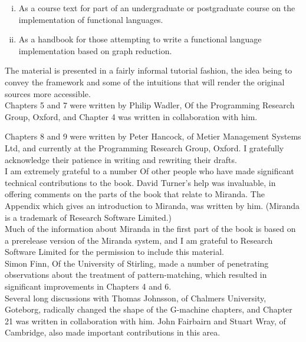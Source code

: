 \documentclass[11pt,a4paper]{book}
\begin{document}
\begin{enumerate}[(i)]
\itemsep-3pt
\item As a course text for part of an undergraduate or postgraduate course on 
the implementation of functional languages. 
\item As a handbook for those attempting to write a functional language 
implementation based on graph reduction.
\end{enumerate}

The material is presented in a fairly informal tutorial fashion, the idea being to 
convey the framework and some of the intuitions that will render the original 
sources more accessible.\\
 
Chapters 5 and 7 were written by Philip Wadler, Of the Programming 
Research Group, Oxford, and Chapter 4 was written in collaboration with
him.

\newpage

\noindent Chapters 8 and 9 were written by Peter Hancock, of Metier Management 
Systems Ltd, and currently at the Programming Research Group, Oxford. I 
gratefully acknowledge their patience in writing and rewriting their drafts.\\

I am extremely grateful to a number Of other people who have made 
significant technical contributions to the book. David Turner's help was 
invaluable, in offering comments on the parts of the book that relate to 
Miranda. The Appendix which gives an introduction to Miranda, was written 
by him. (Miranda is a trademark of Research Software Limited.)\\
 
Much of the information about Miranda in the first part of the book is based 
on a prerelease version of the Miranda system, and I am grateful to Research 
Software Limited for the permission to include this material.\\

Simon Finn, Of the University of Stirling, made a number of penetrating 
observations about the treatment of pattern-matching, which resulted in 
significant improvements in Chapters 4 and 6.\\

Several long discussions with Thomas Johnsson, of Chalmers University, 
Goteborg, radically changed the shape of the G-machine chapters, and 
Chapter 21 was written in collaboration with him. John Fairbairn and Stuart 
Wray, of Cambridge, also made important contributions in this area.\\
\end{document}
